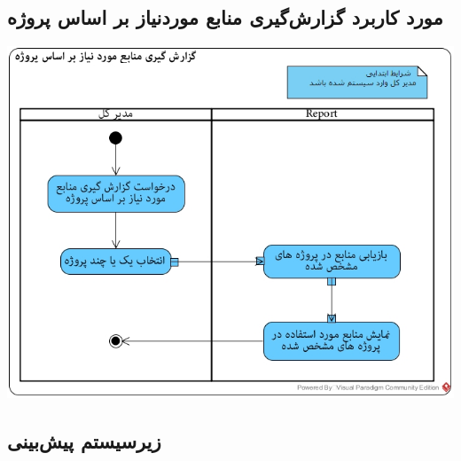 \newpage
\vspace{2cm}
\subsection*{مورد کاربرد گزارش‌گیری منابع موردنیاز بر اساس پروژه}
\vspace{2cm}
\begin{center}
\includegraphics[width=\textwidth]{ActivityDiagramsWithSwimlanes/42.jpg}
\end{center}


\newpage
\subsection{زیرسیستم پیش‌بینی}

\vspace{2cm}
